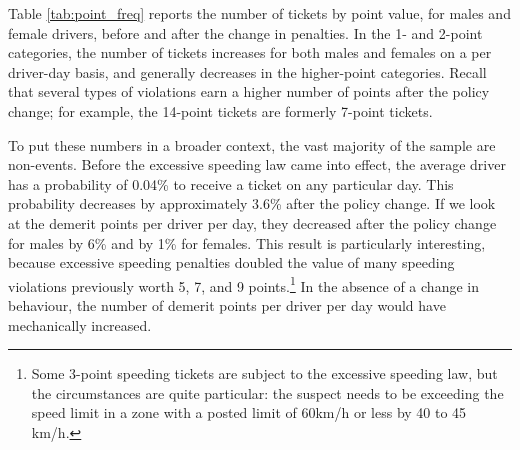 


Table \ref{tab:point_freq} reports %
the number of tickets by point value, 
for males and female drivers, before and after the
change in penalties. 
In the 1- and 2-point categories, the number of tickets increases 
for both males and females on a per driver-day basis, 
and generally decreases in the higher-point categories. 
Recall that several types of violations
earn a higher number of points after the policy change; 
for example, 
the 14-point tickets are formerly 7-point tickets.

To put these numbers in a broader context, 
the vast majority of the sample are non-events. 
Before the excessive speeding law came into effect, 
the average driver has a probability of 0.04\% to receive a ticket 
on any particular day. 
This probability decreases by approximately 3.6\% after the policy change. 
If we look at the demerit points per driver per day, 
they decreased after the policy change for males by 6\% and by 1\% for females. 
This result is particularly interesting, 
because excessive speeding penalties doubled the value of many 
speeding violations previously worth 5, 7, and 9 points.\footnote{%
Some 3-point speeding tickets are subject to the excessive speeding law, 
but the circumstances are quite particular: 
the suspect needs to be exceeding the speed limit in a zone 
with a posted limit of 60km/h or less by 40 to 45 km/h.}
In the absence of a change in behaviour, 
the number of demerit points per driver per day 
would have mechanically increased. %



